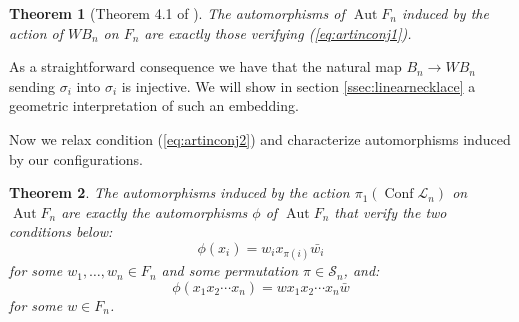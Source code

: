 \documentclass[11pt]{amsart}
\newtheorem{theorem}{Theorem}
\begin{document}
\begin{theorem}[Theorem 4.1 of \cite{FRR}]
The automorphisms of ${\mathop{\mathrm{Aut}}\nolimits} F_n$ induced  by the action of $WB_n$ on $F_n$ are exactly  those verifying (\ref{eq:artinconj1}).
\end{theorem}

 As a straightforward consequence we have
 that the natural map $B_n \to WB_n$
sending $\sigma_i$ into $\sigma_i$ is injective. We will show in  section \ref{ssec:linearnecklace} a geometric interpretation of
such an embedding.
 
\bigskip

Now we relax condition (\ref{eq:artinconj2}) and characterize automorphisms induced by our configurations.
\begin{theorem}
\label{th:circularartin}
The automorphisms induced by the action 
$\pi_1({\mathop{\mathrm{Conf}}\nolimits} \mathcal{L}_n)$ on ${\mathop{\mathrm{Aut}}\nolimits} F_n$ are exactly 
the automorphisms $\phi$ of ${\mathop{\mathrm{Aut}}\nolimits} F_n$ that verify the two conditions below:
\begin{equation}
\label{eq:conj1}
\phi(x_i)=w_i x_{\pi(i)} {\bar{{w_i}}}  
\end{equation}
for some $w_1,\ldots,w_n \in F_n$ and some permutation $\pi \in \mathcal{S}_n$, and:
\begin{equation}
\label{eq:conj2}
\phi(x_1x_2\cdots x_n) = w  x_1x_2\cdots x_n {\bar{{w}}} 
\end{equation}
for some $w \in F_n$.
\end{theorem}
\end{document}
